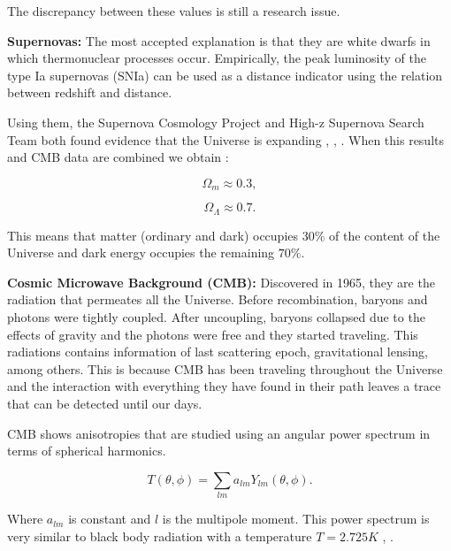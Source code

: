\documentclass[onecolumn,           %
               showpacs,            %
               preprintnumbers,     %
               aps,                 %
               prl,          	    %
               letterpaper,             %
               superscriptaddress,      %
               nofootinbib,         %
               tightenlines,        %
               floats,floatfix      %
               ,usenatbib,
               ]{revtex4-1}
\begin{document}
The discrepancy between these values ​​is still a research issue.

\textbf{Supernovas:} The most accepted explanation is that they are white dwarfs in which thermonuclear processes occur. Empirically, the peak luminosity of the type Ia supernovas (SNIa) can be used as a distance indicator using the relation between redshift and distance\cite{parametros}. 

Using them, the Supernova Cosmology Project and High-z Supernova Search Team both found evidence that the Universe is expanding \cite{supernova1}, \cite{supernova2}, \cite{supernova3}. When this results and CMB data are combined we obtain \cite{parametros}:

\begin{equation}
\Omega_m \approx 0.3,
\end{equation}

\begin{equation}
\Omega_{\Lambda} \approx 0.7 .
\end{equation}

This means that matter (ordinary and dark) occupies $30 \%$ of the content of the Universe and dark energy occupies the remaining $70 \%$. 

\textbf{Cosmic Microwave Background (CMB):} Discovered in 1965, they are the radiation that permeates all the Universe. Before recombination, baryons and photons were tightly coupled. After uncoupling, baryons collapsed due to the effects of gravity and the photons were free and they started traveling. This radiations contains information of last scattering epoch, gravitational lensing, among others. This is because CMB has been traveling throughout the Universe and the interaction with everything they have found in their path leaves a trace that can be detected until our days.

CMB shows anisotropies that are studied using an angular power spectrum in terms of spherical harmonics.

\begin{equation}
T(\theta, \phi) = \sum_{lm} a_{lm} Y_{lm} \left(\theta, \phi \right) .
\end{equation}

Where $a_{lm}$ is constant and $l$ is the multipole moment. This power spectrum is very similar to black body radiation with a temperature $T = 2.725K$ \cite{CMB1}, \cite{CMB2}.
\end{document}
